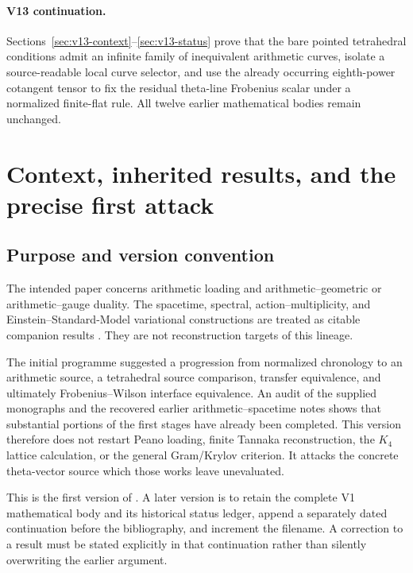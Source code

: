 \documentclass[11pt]{article}
\theoremstyle{definition}
\theoremstyle{remark}
\begin{document}
\paragraph{V13 continuation.}
Sections~\ref{sec:v13-context}--\ref{sec:v13-status} prove that the bare
pointed tetrahedral conditions admit an infinite family of inequivalent
arithmetic curves, isolate a source-readable local curve selector, and use
the already occurring eighth-power cotangent tensor to fix the residual
theta-line Frobenius scalar under a normalized finite-flat rule. All twelve
earlier mathematical bodies remain unchanged.

\section{Context, inherited results, and the precise first attack}
\label{sec:context}

\subsection{Purpose and version convention}
The intended paper concerns arithmetic loading and arithmetic--geometric or arithmetic--gauge duality. The spacetime, spectral, action--multiplicity, and Einstein--Standard-Model variational constructions are treated as citable companion results \cite{Spacetime,Spectral,Duality,Variational}. They are not reconstruction targets of this lineage.

The initial programme suggested a progression from normalized chronology to an arithmetic source, a tetrahedral source comparison, transfer equivalence, and ultimately Frobenius--Wilson interface equivalence. An audit of the supplied monographs and the recovered earlier arithmetic--spacetime notes \cite{GT77,Arithmetic,AD9} shows that substantial portions of the first stages have already been completed. This version therefore does not restart Peano loading, finite Tannaka reconstruction, the $K_4$ lattice calculation, or the general Gram/Krylov criterion. It attacks the concrete theta-vector source which those works leave unevaluated.

This is the first version of . A later version is to retain the complete V1 mathematical body and its historical status ledger, append a separately dated continuation before the bibliography, and increment the filename. A correction to a result must be stated explicitly in that continuation rather than silently overwriting the earlier argument.
\end{document}
